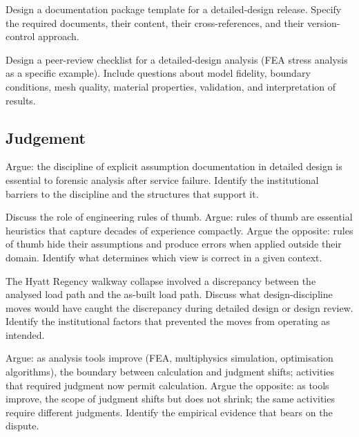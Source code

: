 \begin{exercise}
Design a documentation package template for a detailed-design release. Specify the required documents, their content, their cross-references, and their version-control approach.
\end{exercise}

\begin{exercise}
Design a peer-review checklist for a detailed-design analysis (FEA stress analysis as a specific example). Include questions about model fidelity, boundary conditions, mesh quality, material properties, validation, and interpretation of results.
\end{exercise}

\subsection*{Judgement}

\begin{exercise}
Argue: the discipline of explicit assumption documentation in detailed design is essential to forensic analysis after service failure. Identify the institutional barriers to the discipline and the structures that support it.
\end{exercise}

\begin{exercise}
Discuss the role of engineering rules of thumb. Argue: rules of thumb are essential heuristics that capture decades of experience compactly. Argue the opposite: rules of thumb hide their assumptions and produce errors when applied outside their domain. Identify what determines which view is correct in a given context.
\end{exercise}

\begin{exercise}
The Hyatt Regency walkway collapse involved a discrepancy between the analysed load path and the as-built load path. Discuss what design-discipline moves would have caught the discrepancy during detailed design or design review. Identify the institutional factors that prevented the moves from operating as intended.
\end{exercise}

\begin{exercise}
Argue: as analysis tools improve (FEA, multiphysics simulation, optimisation algorithms), the boundary between calculation and judgment shifts; activities that required judgment now permit calculation. Argue the opposite: as tools improve, the scope of judgment shifts but does not shrink; the same activities require different judgments. Identify the empirical evidence that bears on the dispute.
\end{exercise}

